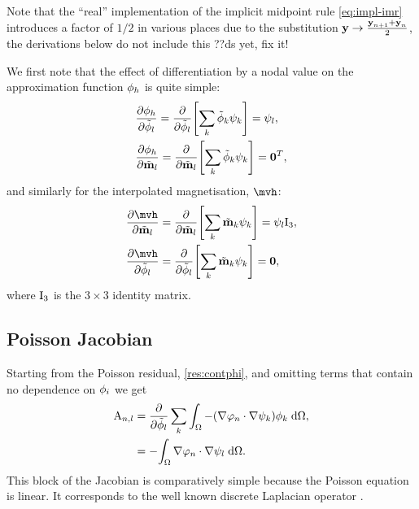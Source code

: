 {Note that the ``real'' implementation of the implicit midpoint rule \cref{eq:impl-imr} introduces a factor of $1/2$ in various places due to the substitution $ \boldsymbol{\mathrm{y}} \rightarrow \frac{\boldsymbol{\mathrm{y}}_{n+1} + \boldsymbol{\mathrm{y}}_n}{2}$, the derivations below do not include this ??ds yet, fix it!

We first note that the effect of differentiation by a nodal value on the approximation function ${\phi}_h$ is quite simple:
\begin{equation}
  \begin{aligned}
    &\frac{\partial {\phi}_h}{\partial \tilde{\phi}_l} = \frac{\partial }{\partial \tilde{\phi}_l} {\left[  \sum_k \tilde{\phi}_k {\psi_k}  \right]} = \psi_l, \\
    &\frac{\partial {\phi}_h}{\partial \tilde{\boldsymbol{\mathrm{m}}}_l} = \frac{\partial }{\partial \tilde{\boldsymbol{\mathrm{m}}}_l} {\left[  \sum_k \tilde{\phi}_k {\psi_k}  \right]} = \mathbf{0}^T, \\
  \end{aligned}
\end{equation}
and similarly for the interpolated magnetisation, $\mvh$:
\begin{equation}
  \begin{aligned}
    &\pd{\mvh}{\mvdis_l} = \pd{}{\mvdis_l} \bigs{ \sum_k \mvdis_k \sk } = \sbf_l \Idm_3, \\
    &\pd{\mvh}{\phimdis_l} = \pd{}{\phimdis_l} \bigs{ \sum_k \mvdis_k \sk } = \zerov, \\
\end{aligned}
\end{equation}
where $\mathrm{I}_3$ is the $3\times3$ identity matrix.

\subsection{Poisson Jacobian}
\label{sec:poisson-jacobian}

Starting from the Poisson residual, \cref{res:contphi}, and omitting terms that contain no dependence on $\phi_i$ we get
\begin{equation}
  \begin{aligned}
    \label{eq:poisson-jacobian}
    \mathrm{A}_{n,l} &= \frac{\partial }{\partial \tilde{\phi}_l} \sum_k {\int_{\Omega} { -(\nabla \varphi_n \cdot \nabla \psi_k) \phi_{k}} {\; \mathrm{{d}}} {\Omega}}, \\
    &= -{\int_{\Omega} {\nabla \varphi_n \cdot \nabla \psi_l} {\; \mathrm{{d}}} {\Omega}}.
  \end{aligned}
\end{equation}
This block of the Jacobian is comparatively simple because the Poisson equation is linear.
It corresponds to the well known discrete Laplacian operator \cite{HowardElmanDavidSilvester2006}.


}
